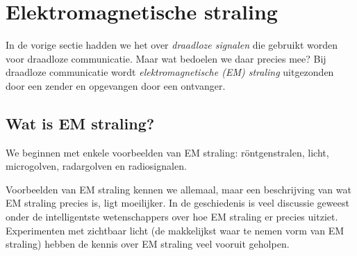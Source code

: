 

        
        
        

 \clearpage
 \section{Elektromagnetische straling}%
 \label{sec:EMgolven}

 In de vorige sectie hadden we het over \emph{draadloze signalen} die gebruikt worden voor draadloze communicatie. Maar wat bedoelen we daar precies mee? Bij draadloze communicatie wordt \emph{elektromagnetische (EM) straling} uitgezonden door een zender en opgevangen door een ontvanger.

 \subsection{Wat is EM straling?}
 We beginnen met enkele voorbeelden van EM straling: r\"ontgenstralen, licht, microgolven, radargolven en radiosignalen. 

 Voorbeelden van EM straling kennen we allemaal, maar een beschrijving van wat EM straling precies is, ligt moeilijker. In de geschiedenis is veel discussie geweest onder de intelligentste wetenschappers over hoe EM straling er precies uitziet. Experimenten met zichtbaar licht (de makkelijkst waar te nemen vorm van EM straling) hebben de kennis over EM straling veel vooruit geholpen.

